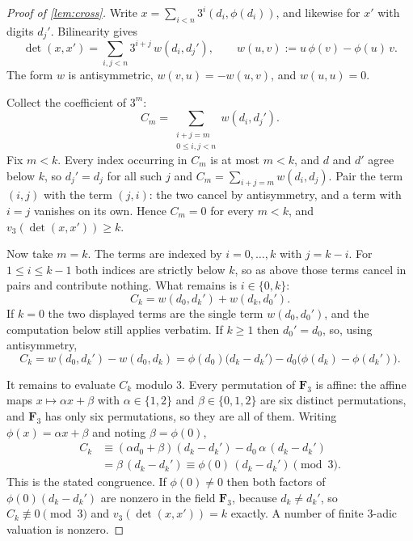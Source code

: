 \documentclass[11pt]{amsart}
\theoremstyle{definition}
\theoremstyle{remark}
\begin{document}
\begin{proof}[Proof of \cref{lem:cross}]
Write $x=\sum_{i<n} 3^i (d_i,\phi(d_i))$, and likewise for $x'$ with digits $d_j'$. Bilinearity gives
\[
\det(x,x')=\sum_{i,j<n} 3^{i+j}\, w(d_i,d_j'), \qquad w(u,v):=u\,\phi(v)-\phi(u)\,v .
\]
The form $w$ is antisymmetric, $w(v,u)=-w(u,v)$, and $w(u,u)=0$.

Collect the coefficient of $3^m$:
\[
C_m=\sum_{\substack{i+j=m\\ 0\le i,j<n}} w(d_i,d_j') .
\]
Fix $m<k$. Every index occurring in $C_m$ is at most $m<k$, and $d$ and $d'$ agree below $k$, so $d_j'=d_j$ for all such $j$ and $C_m=\sum_{i+j=m} w(d_i,d_j)$. Pair the term $(i,j)$ with the term $(j,i)$: the two cancel by antisymmetry, and a term with $i=j$ vanishes on its own. Hence $C_m=0$ for every $m<k$, and $v_3(\det(x,x'))\ge k$.

Now take $m=k$. The terms are indexed by $i=0,\dots,k$ with $j=k-i$. For $1\le i\le k-1$ both indices are strictly below $k$, so as above those terms cancel in pairs and contribute nothing. What remains is $i\in\{0,k\}$:
\[
C_k=w(d_0,d_k')+w(d_k,d_0') .
\]
If $k=0$ the two displayed terms are the single term $w(d_0,d_0')$, and the computation below still applies verbatim. If $k\ge 1$ then $d_0'=d_0$, so, using antisymmetry,
\[
C_k=w(d_0,d_k')-w(d_0,d_k)=\phi(d_0)\bigl(d_k-d_k'\bigr)-d_0\bigl(\phi(d_k)-\phi(d_k')\bigr).
\]

It remains to evaluate $C_k$ modulo $3$. Every permutation of $\mathbf{F}_3$ is affine: the affine maps $x\mapsto \alpha x+\beta$ with $\alpha\in\{1,2\}$ and $\beta\in\{0,1,2\}$ are six distinct permutations, and $\mathbf{F}_3$ has only six permutations, so they are all of them. Writing $\phi(x)=\alpha x+\beta$ and noting $\beta=\phi(0)$,
\begin{align*}
C_k &\equiv (\alpha d_0+\beta)(d_k-d_k')-d_0\,\alpha\,(d_k-d_k')\\
&= \beta\,(d_k-d_k') \equiv \phi(0)\,(d_k-d_k') \pmod 3 .
\end{align*}
This is the stated congruence. If $\phi(0)\neq 0$ then both factors of $\phi(0)(d_k-d_k')$ are nonzero in the field $\mathbf{F}_3$, because $d_k\neq d_k'$, so $C_k\not\equiv 0 \pmod 3$ and $v_3(\det(x,x'))=k$ exactly. A number of finite $3$-adic valuation is nonzero.
\end{proof}
\end{document}
